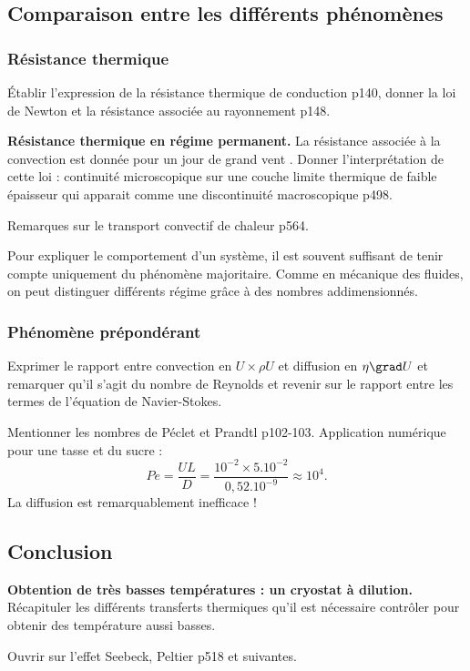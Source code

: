 \subsection{Comparaison entre les différents phénomènes}

\subsubsection{Résistance thermique}

Établir l'expression de la résistance thermique de conduction \cite{Sanz2016} p140, donner la loi de Newton et la résistance associée au rayonnement p148.

\begin{slide}
\textbf{Résistance thermique en régime permanent.}
La résistance associée à la convection est donnée pour un \og jour de grand vent \fg{}.
Donner l'interprétation de cette loi : continuité microscopique sur une couche limite thermique de faible épaisseur qui apparait comme une discontinuité macroscopique \cite{Diu2008} p498.
\end{slide}

\begin{remarque}
Remarques sur le transport convectif de chaleur \cite{Guyon2001} p564.
\end{remarque}

\begin{transition}
Pour expliquer le comportement d'un système, il est souvent suffisant de tenir compte uniquement du phénomène majoritaire.
Comme en mécanique des fluides, on peut distinguer différents régime grâce à des nombres addimensionnés.
\end{transition}

\subsubsection{Phénomène prépondérant}

Exprimer le rapport entre convection en $U \times \rho U$ et diffusion en $\eta \grad U$ et remarquer qu'il s'agit du nombre de Reynolds et revenir sur le rapport entre les termes de l'équation de Navier-Stokes.

Mentionner les nombres de Péclet et Prandtl \cite{Guyon2001} p102-103.
Application numérique pour une tasse et du sucre :
\begin{equation}
Pe = \frac{UL}{D} = \frac{10^{-2}\times 5.10^{-2}}{0,52.10^{-9}} \approx 10^4.
\end{equation}
La diffusion est remarquablement inefficace !

\subsection*{Conclusion}

\begin{slide}
\textbf{Obtention de très basses températures  : un cryostat à dilution.}
Récapituler les différents transferts thermiques qu'il est nécessaire contrôler pour obtenir des température aussi basses. 
\end{slide}

Ouvrir sur l'effet Seebeck, Peltier \cite{Diu2008} p518 et suivantes.

\newpage